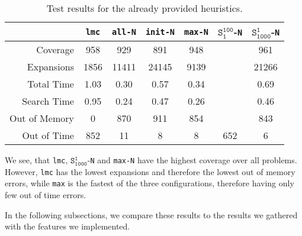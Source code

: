 \begin{table}[h!]
    \begin{center}
        \begin{tabular}{|r|c|c|c|c|c|c|}
            \hline
            & \textbf{\texttt{lmc}} & \textbf{\texttt{all-N}} & \textbf{\texttt{init-N}} & \textbf{\texttt{max-N}} & \textbf{$\texttt{S}_\texttt{1}^\texttt{100}$-\texttt{N}} & \textbf{$\texttt{S}_\texttt{1000}^\texttt{1}$-\texttt{N}} \\
            \hline \hline
            Coverage & 958 & 929 & 891 & 948 &  & 961 \\ \hline
            Expansions & 1856 & 11411 & 24145 & 9139 &  & 21266 \\ \hline
            Total Time & 1.03 & 0.30 & 0.57 & 0.34 &  & 0.69 \\ \hline
            Search Time & 0.95 & 0.24 & 0.47 & 0.26 &  & 0.46 \\ \hline
            Out of Memory & 0 & 870 & 911 & 854 &  & 843 \\ \hline
            Out of Time & 852 & 11 & 8 & 8 & 652 & 6 \\ \hline
        \end{tabular}
        \caption{Test results for the already provided heuristics.}
        \label{table:standard_heuristics}
    \end{center}
\end{table}

We see, that \texttt{lmc}, $\texttt{S}_\texttt{1000}^\texttt{1}$-\texttt{N} and \texttt{max-N} have the highest coverage over all problems.
However, \texttt{lmc} has the lowest expansions and therefore the lowest out of memory errors, while \texttt{max} is the fastest of the three configurations, therefore having only few out of time errors.

In the following subsections, we compare these results to the results we gathered with the features we implemented.


